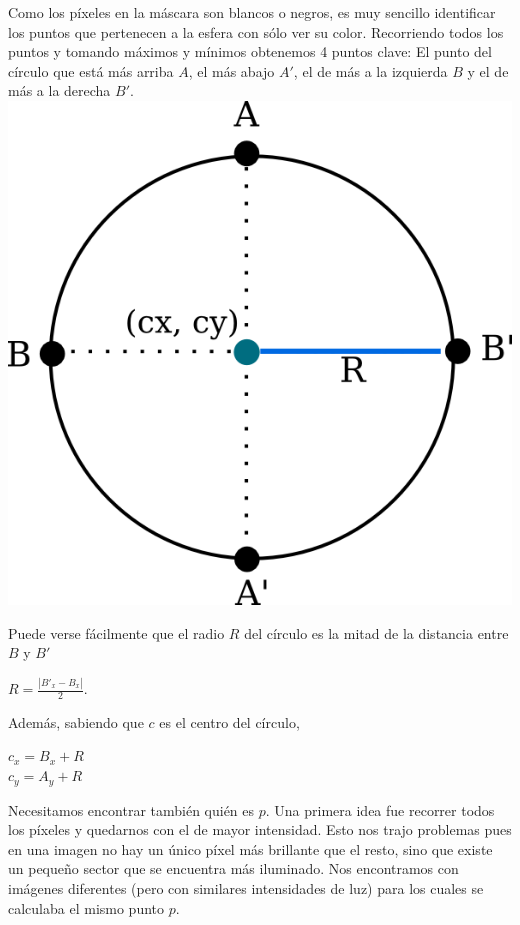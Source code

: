 Como los píxeles en la máscara son blancos o negros, es muy sencillo identificar los puntos que pertenecen a la esfera con sólo ver su color. Recorriendo todos los puntos y tomando máximos y mínimos obtenemos 4 puntos clave: El punto del círculo que está más arriba $A$, el más abajo $A'$, el de más a la izquierda $B$ y el de más a la derecha $B'$. \\

{\centering
    \includegraphics[scale=0.5]{informe/imagenes/esfera/circulo.png} \\
}

Puede verse fácilmente que el radio $R$ del círculo es la mitad de la distancia entre $B$ y $B'$

\begin{center}
$R = \frac{|B'_x - B_x|}{2}$.
\end{center}

Además, sabiendo que $c$ es el centro del círculo,

\begin{center}
    $c_{x} = B_x + R$ \\
    $c_{y} = A_y + R$
\end{center}

Necesitamos encontrar también quién es $p$. Una primera idea fue recorrer todos los píxeles y quedarnos con el de mayor intensidad. Esto nos trajo problemas pues en una imagen no hay un único píxel más brillante que el resto, sino que existe un pequeño sector que se encuentra más iluminado. Nos encontramos con imágenes diferentes (pero con similares intensidades de luz) para los cuales se calculaba el mismo punto $p$. \\

